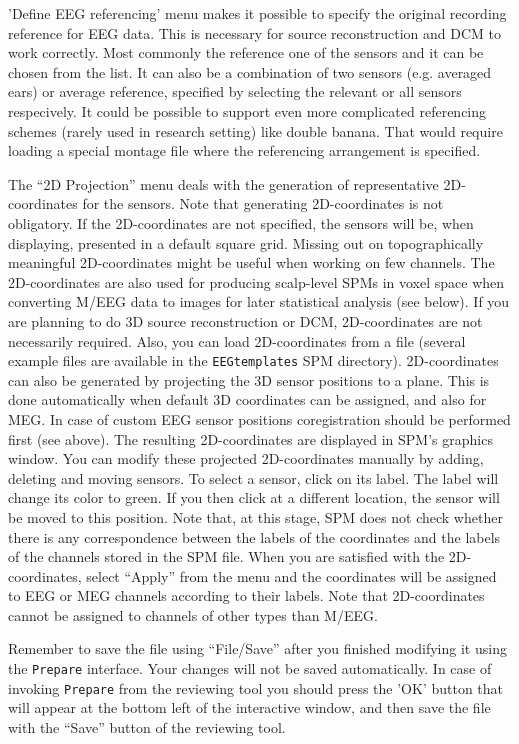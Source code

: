 'Define EEG referencing' menu makes it possible to specify the original recording reference for EEG data. This is necessary for source reconstruction and DCM to work correctly. Most commonly the reference one of the sensors and it can be chosen from the list. It can also be a combination of two sensors (e.g. averaged ears) or average reference, specified by selecting the relevant or all sensors respecively. It could be possible to support even more complicated referencing schemes (rarely used in research setting) like double banana. That would require loading a special montage file where the referencing arrangement is specified. 

The ``2D Projection'' menu deals with the generation of representative 2D-coordinates for the sensors. Note that generating 2D-coordinates is
not obligatory. If the 2D-coordinates are not specified, the sensors will be, when displaying, presented in a default square grid. Missing out
on topographically meaningful 2D-coordinates might be useful when working on few channels. The 2D-coordinates are also used for producing scalp-level SPMs in voxel space when converting M/EEG data to images for later statistical analysis (see below). If you are
planning to do 3D source reconstruction or DCM, 2D-coordinates are not necessarily required. Also, you can load 2D-coordinates from a file (several example files are available in the \texttt{EEGtemplates} SPM directory). 2D-coordinates can also be generated by projecting the 3D sensor positions to a plane. This is done automatically when default 3D coordinates can be assigned, and also for MEG. In case of custom EEG sensor positions coregistration should be performed first (see above). The resulting 2D-coordinates are displayed in SPM's graphics window. You can modify these projected 2D-coordinates manually by adding, deleting and moving sensors. To select a sensor, click on its label. The label will change its color to green. If you then click at a different location, the sensor will be moved to this position. Note that, at this stage, SPM does not check whether there is any correspondence between the labels of the coordinates and the labels of the channels stored in the SPM file. When you are satisfied with the 2D-coordinates, select ``Apply'' from the menu and the coordinates will be assigned to EEG or MEG channels according to their labels. Note that 2D-coordinates cannot be assigned to channels of other types than M/EEG.

Remember to save the file using ``File/Save'' after you finished modifying it using the \texttt{Prepare} interface. Your changes will not be saved automatically. In case of invoking \texttt{Prepare} from the reviewing tool you should press the 'OK' button that will appear at the bottom left of the interactive window, and then save the file with the ``Save'' button of the reviewing tool.

